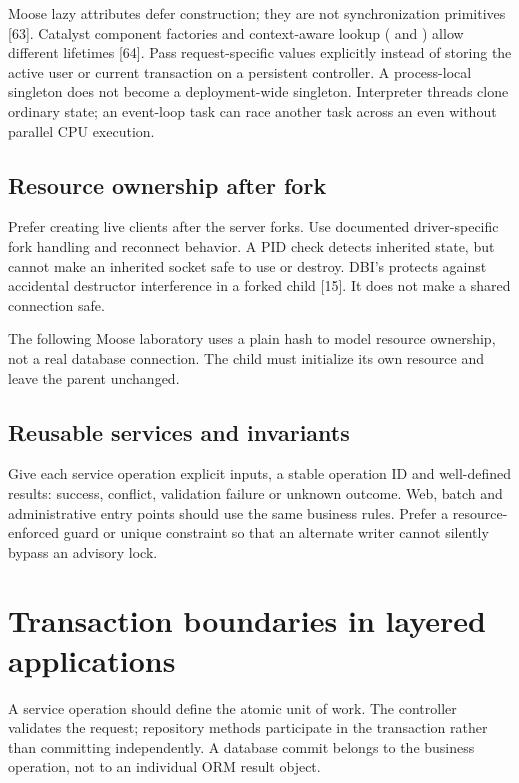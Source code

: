 Moose lazy attributes defer construction; they are not synchronization
primitives [63]. Catalyst component factories and context-aware lookup
( and ) allow different lifetimes [64].
Pass request-specific values explicitly instead of storing the active user
or current transaction on a persistent controller. A process-local singleton
does not become a deployment-wide singleton. Interpreter threads clone ordinary
state; an event-loop task can race another task across an  even
without parallel CPU execution.

\section{Resource ownership after fork}
Prefer creating live clients after the server forks. Use documented
driver-specific fork handling and reconnect behavior. A PID check detects
inherited state, but cannot make an inherited socket safe to use or destroy.
DBI's  protects against accidental destructor
interference in a forked child [15]. It does not make a shared connection safe.


The following Moose laboratory uses a plain hash to model resource ownership,
not a real database connection. The child must initialize its own resource
and leave the parent unchanged.

\section{Reusable services and invariants}
Give each service operation explicit inputs, a stable operation ID and
well-defined results: success, conflict, validation failure or unknown
outcome. Web, batch and administrative entry points should use the same
business rules. Prefer a resource-enforced guard or unique constraint so
that an alternate writer cannot silently bypass an advisory lock.

\chapter{Transaction boundaries in layered applications}
\label{ch:enterprise-transactions}
A service operation should define the atomic unit of work. The controller
validates the request; repository methods participate in the transaction
rather than committing independently. A database commit belongs to the
business operation, not to an individual ORM result object.

